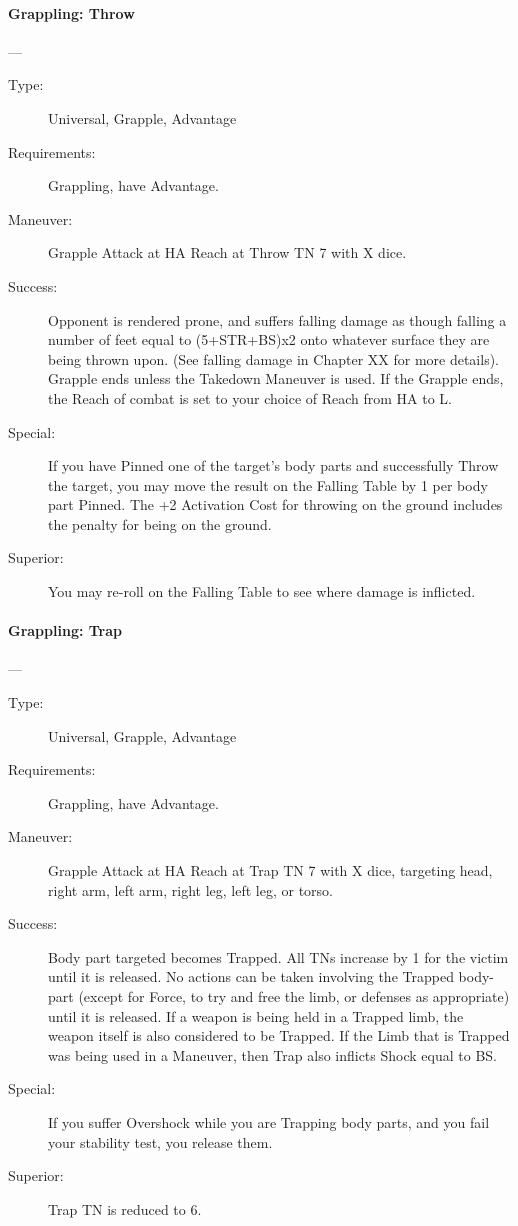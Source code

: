 \documentclass[oneside,11pt,english]{book}
\begin{document}
\paragraph{\large\label{man:Grappling: Throw}Grappling: Throw}---\quad{\large[X+2]}
\vspace{-10pt}\begin{description} 
\item [Type:] Universal, Grapple, Advantage 
\item [Requirements:] Grappling, have Advantage. 
\item [Maneuver:] Grapple Attack at HA Reach at Throw TN 7 with X dice. 
\item [Success:] Opponent is rendered prone, and suffers falling damage as though falling a number of feet equal 
to (5+STR+BS)x2 onto whatever surface they are being thrown upon. (See falling damage in Chapter XX 
for more details).
Grapple ends unless the Takedown Maneuver is used. If the Grapple ends, the Reach of combat is set to 
your choice of Reach from HA to L. 
\item [Special:] If you have Pinned one of the target's body parts and successfully Throw the target, you may 
move the result on the Falling Table by 1 per body part Pinned. 
The +2 Activation Cost for throwing on the ground includes the penalty for being on the ground. 
\item [Superior:] You may re-roll on the Falling Table to see where damage is inflicted. 
\end{description}
\paragraph{\large\label{man:Grappling: Trap}Grappling: Trap}---\quad{\large[X]}
\vspace{-10pt}\begin{description} 
\item [Type:] Universal, Grapple, Advantage 
\item [Requirements:] Grappling, have Advantage. 
\item [Maneuver:] Grapple Attack at HA Reach at Trap TN 7 with X dice, targeting head, right arm, left arm, 
right leg, left leg, or torso. 
\item [Success:] Body part targeted becomes Trapped. All TNs increase by 1 for the victim until it is released. No 
actions can be taken involving the Trapped body-part (except for Force, to try and free the limb, or 
defenses as appropriate) until it is released. If a weapon is being held in a Trapped limb, the weapon itself 
is also considered to be Trapped. If the Limb that is Trapped was being used in a Maneuver, then Trap 
also inflicts Shock equal to BS. 
\item [Special:] If you suffer Overshock while you are Trapping body parts, and you fail your stability test, you 
release them. 
\item [Superior:] Trap TN is reduced to 6. 
\end{description}
\end{document}
